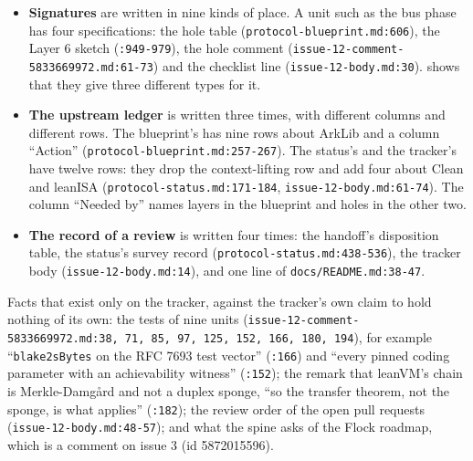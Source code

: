 \begin{itemize}
\item \textbf{Signatures} are written in nine kinds of place. A unit such as the bus phase has four specifications: the hole table (\texttt{protocol-\allowbreak{}blueprint.\allowbreak{}md:\allowbreak{}606}), the Layer 6 sketch (\texttt{:\allowbreak{}949-\allowbreak{}979}), the hole comment (\texttt{issue-\allowbreak{}12-\allowbreak{}comment-\allowbreak{}5833669972.\allowbreak{}md:\allowbreak{}61-\allowbreak{}73}) and the checklist line (\texttt{issue-\allowbreak{}12-\allowbreak{}body.\allowbreak{}md:\allowbreak{}30}).  shows that they give three different types for it.
\item \textbf{The upstream ledger} is written three times, with different columns and different rows. The blueprint's has nine rows about ArkLib and a column ``Action'' (\texttt{protocol-\allowbreak{}blueprint.\allowbreak{}md:\allowbreak{}257-\allowbreak{}267}). The status's and the tracker's have twelve rows: they drop the context-lifting row and add four about Clean and leanISA (\texttt{protocol-\allowbreak{}status.\allowbreak{}md:\allowbreak{}171-\allowbreak{}184}, \texttt{issue-\allowbreak{}12-\allowbreak{}body.\allowbreak{}md:\allowbreak{}61-\allowbreak{}74}). The column ``Needed by'' names layers in the blueprint and holes in the other two.
\item \textbf{The record of a review} is written four times: the handoff's disposition table, the status's survey record (\texttt{protocol-\allowbreak{}status.\allowbreak{}md:\allowbreak{}438-\allowbreak{}536}), the tracker body (\texttt{issue-\allowbreak{}12-\allowbreak{}body.\allowbreak{}md:\allowbreak{}14}), and one line of \texttt{docs/\allowbreak{}README.\allowbreak{}md:\allowbreak{}38-\allowbreak{}47}.
\end{itemize}

\begin{sloppypar}
Facts that exist only on the tracker, against the tracker's own claim to hold nothing of its own: the tests of nine units (\texttt{issue-\allowbreak{}12-\allowbreak{}comment-\allowbreak{}5833669972.\allowbreak{}md:\allowbreak{}38,\allowbreak{} 71,\allowbreak{} 85,\allowbreak{} 97,\allowbreak{} 125,\allowbreak{} 152,\allowbreak{} 166,\allowbreak{} 180,\allowbreak{} 194}), for example ``\texttt{blake2sBytes} on the RFC 7693 test vector'' (\texttt{:\allowbreak{}166}) and ``every pinned coding parameter with an achievability witness'' (\texttt{:\allowbreak{}152}); the remark that leanVM's chain is Merkle-Damgård and not a duplex sponge, ``so the transfer theorem, not the sponge, is what applies'' (\texttt{:\allowbreak{}182}); the review order of the open pull requests (\texttt{issue-\allowbreak{}12-\allowbreak{}body.\allowbreak{}md:\allowbreak{}48-\allowbreak{}57}); and what the spine asks of the Flock roadmap, which is a comment on issue 3 (id 5872015596).
\end{sloppypar}
